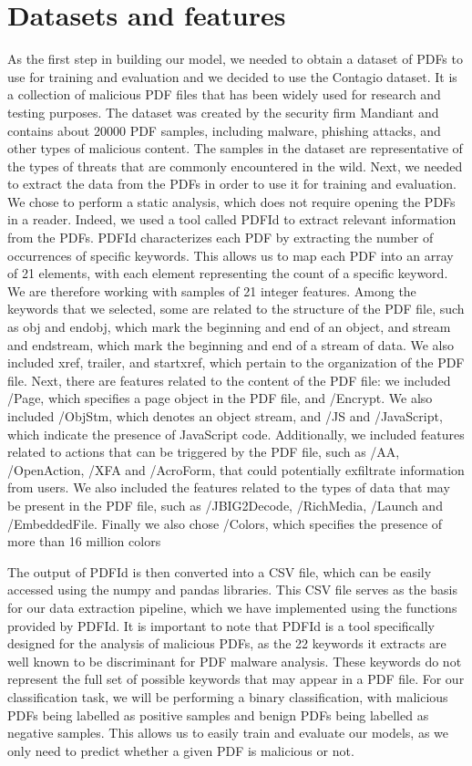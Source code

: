 \documentclass[twocolumn, switch]{article} %
\begin{document}
\section{Datasets and features}
\label{sec:datasetsandfeatures}
As the first step in building our model, we needed to obtain a dataset of PDFs to use for training and evaluation and we decided to use the Contagio dataset. It is a collection of malicious PDF files that has been widely used for research and testing purposes. The dataset was created by the security firm Mandiant and contains about 20000 PDF samples, including malware, phishing attacks, and other types of malicious content. The samples in the dataset are representative of the types of threats that are commonly encountered in the wild.
Next, we needed to extract the data from the PDFs in order to use it for training and evaluation. We chose to perform a static analysis, which does not require opening the PDFs in a reader. Indeed, we used a tool called PDFId to extract relevant information from the PDFs. PDFId characterizes each PDF by extracting the number of occurrences of specific keywords. This allows us to map each PDF into an array of 21 elements, with each element representing the count of a specific keyword. We are therefore working with samples of 21 integer features.
Among the keywords that we selected, some are related to the structure of the PDF file, such as obj and endobj, which mark the beginning and end of an object, and stream and endstream, which mark the beginning and end of a stream of data. We also included xref, trailer, and startxref, which pertain to the organization of the PDF file. Next, there are features related to the content of the PDF file: we included /Page, which specifies a page object in the PDF file, and /Encrypt. We also included /ObjStm, which denotes an object stream, and /JS and /JavaScript, which indicate the presence of JavaScript code. Additionally, we included features related to actions that can be triggered by the PDF file, such as /AA, /OpenAction, /XFA and /AcroForm, that could potentially exfiltrate information from users. We also included the features related to the types of data that may be present in the PDF file, such as /JBIG2Decode, /RichMedia, /Launch and /EmbeddedFile. Finally we also chose /Colors, which specifies the presence of more than 16 million colors

The output of PDFId is then converted into a CSV file, which can be easily accessed using the numpy and pandas libraries. This CSV file serves as the basis for our data extraction pipeline, which we have implemented using the functions provided by PDFId. It is important to note that PDFId is a tool specifically designed for the analysis of malicious PDFs, as the 22 keywords it extracts are well known to be discriminant for PDF malware analysis. These keywords do not represent the full set of possible keywords that may appear in a PDF file.
For our classification task, we will be performing a binary classification, with malicious PDFs being labelled as positive samples and benign PDFs being labelled as negative samples. This allows us to easily train and evaluate our models, as we only need to predict whether a given PDF is malicious or not.
\end{document}
